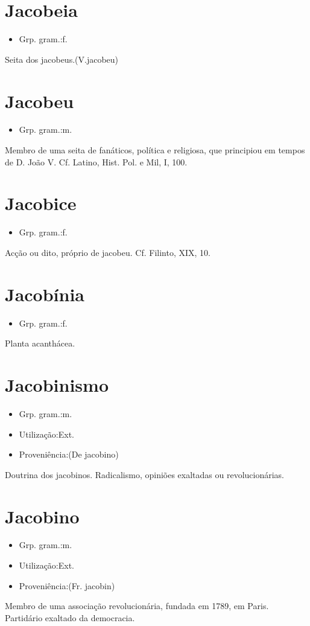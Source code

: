 \documentclass{article}
\begin{document}
\section{Jacobeia}
\begin{itemize}
\item {Grp. gram.:f.}
\end{itemize}
Seita dos jacobeus.(V.jacobeu)
\section{Jacobeu}
\begin{itemize}
\item {Grp. gram.:m.}
\end{itemize}
Membro de uma seita de fanáticos, política e religiosa, que principiou em tempos de D. João V. Cf. Latino, \textunderscore Hist. Pol. e Mil\textunderscore , I, 100.
\section{Jacobice}
\begin{itemize}
\item {Grp. gram.:f.}
\end{itemize}
Acção ou dito, próprio de jacobeu. Cf. Filinto, XIX, 10.
\section{Jacobínia}
\begin{itemize}
\item {Grp. gram.:f.}
\end{itemize}
Planta acanthácea.
\section{Jacobinismo}
\begin{itemize}
\item {Grp. gram.:m.}
\end{itemize}
\begin{itemize}
\item {Utilização:Ext.}
\end{itemize}
\begin{itemize}
\item {Proveniência:(De \textunderscore jacobino\textunderscore )}
\end{itemize}
Doutrina dos jacobinos.
Radicalismo, opiniões exaltadas ou revolucionárias.
\section{Jacobino}
\begin{itemize}
\item {Grp. gram.:m.}
\end{itemize}
\begin{itemize}
\item {Utilização:Ext.}
\end{itemize}
\begin{itemize}
\item {Proveniência:(Fr. \textunderscore jacobin\textunderscore )}
\end{itemize}
Membro de uma associação revolucionária, fundada em 1789, em Paris.
Partidário exaltado da democracia.
\end{document}
